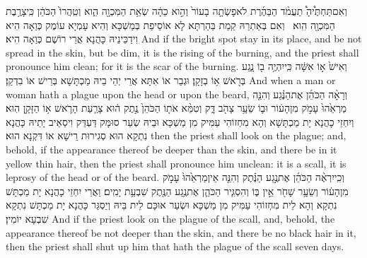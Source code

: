 {וְאִם\maqqaf תַּחְתֶּ֩יהָ֩ תַעֲמֹ֨ד הַבַּהֶ֜רֶת לֹא\maqqaf פָשְׂתָ֤ה בָעוֹר֙ וְהִ֣וא כֵהָ֔ה שְׂאֵ֥ת הַמִּכְוָ֖ה הִ֑וא וְטִֽהֲרוֹ֙ הַכֹּהֵ֔ן כִּֽי\maqqaf צָרֶ֥בֶת הַמִּכְוָ֖ה הִֽוא׃ \petucha }
{וְאִם בְּאַתְרַהּ קַמַת בַּהַרְתָּא לָא אוֹסֵיפַת בְּמַשְׁכָּא וְהִיא עָמְיָא עוֹמֶק כְּוַאָה הִיא וִידַכֵּינֵיהּ כָּהֲנָא אֲרֵי רוֹשֶׁם כְּוַאָה הִיא׃}
{And if the bright spot stay in its place, and be not spread in the skin, but be dim, it is the rising of the burning, and the priest shall pronounce him clean; for it is the scar of the burning.}{}
{וְאִישׁ֙ א֣וֹ אִשָּׁ֔ה כִּֽי\maqqaf יִהְיֶ֥ה ב֖וֹ נָ֑גַע בְּרֹ֖אשׁ א֥וֹ בְזָקָֽן׃}
{וּגְבַר אוֹ אִתָּא אֲרֵי יְהֵי בֵיהּ מַכְתָּשָׁא בְּרֵישׁ אוֹ בִדְקַן׃}
{And when a man or woman hath a plague upon the head or upon the beard,}{}
{וְרָאָ֨ה הַכֹּהֵ֜ן אֶת\maqqaf הַנֶּ֗גַע וְהִנֵּ֤ה מַרְאֵ֙הוּ֙ עָמֹ֣ק מִן\maqqaf הָע֔וֹר וּב֛וֹ שֵׂעָ֥ר צָהֹ֖ב דָּ֑ק וְטִמֵּ֨א אֹת֤וֹ הַכֹּהֵן֙ נֶ֣תֶק ה֔וּא צָרַ֧עַת הָרֹ֛אשׁ א֥וֹ הַזָּקָ֖ן הֽוּא׃}
{וְיִחְזֵי כָהֲנָא יָת מַכְתָּשָׁא וְהָא מִחְזוֹהִי עַמִּיק מִן מַשְׁכָּא וּבֵיהּ שְׂעַר סוּמָּק דַּעְדַּק וִיסַאֵיב יָתֵיהּ כָּהֲנָא נִתְקָא הוּא סְגִירוּת רֵישָׁא אוֹ דִּקְנָא הוּא׃}
{then the priest shall look on the plague; and, behold, if the appearance thereof be deeper than the skin, and there be in it yellow thin hair, then the priest shall pronounce him unclean: it is a scall, it is leprosy of the head or of the beard.}{}
{וְכִֽי\maqqaf יִרְאֶ֨ה הַכֹּהֵ֜ן אֶת\maqqaf נֶ֣גַע הַנֶּ֗תֶק וְהִנֵּ֤ה אֵין\maqqaf מַרְאֵ֙הוּ֙ עָמֹ֣ק מִן\maqqaf הָע֔וֹר וְשֵׂעָ֥ר שָׁחֹ֖ר אֵ֣ין בּ֑וֹ וְהִסְגִּ֧יר הַכֹּהֵ֛ן אֶת\maqqaf נֶ֥גַע הַנֶּ֖תֶק שִׁבְעַ֥ת יָמִֽים׃}
{וַאֲרֵי יִחְזֵי כָהֲנָא יָת מַכְתָּשׁ נִתְקָא וְהָא לֵית מִחְזוֹהִי עַמִּיק מִן מַשְׁכָּא וּשְׂעַר אוּכָּם לֵית בֵּיהּ וְיַסְגַּר כָּהֲנָא יָת מַכְתָּשׁ נִתְקָא שִׁבְעָא יוֹמִין׃}
{And if the priest look on the plague of the scall, and, behold, the appearance thereof be not deeper than the skin, and there be no black hair in it, then the priest shall shut up him that hath the plague of the scall seven days.}{}
